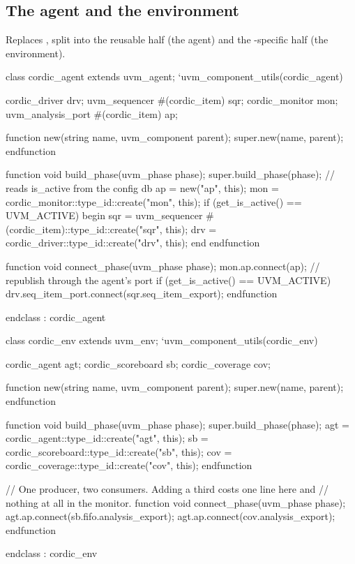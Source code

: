 \subsection{The agent and the environment}

Replaces , split into the reusable half (the agent) and the
\DUT{}-specific half (the environment).

\begin{uvmcode}[caption={\code{cordic\_agent} and \code{cordic\_env}},label={lst:uvm:env}]
  class cordic_agent extends uvm_agent;
    `uvm_component_utils(cordic_agent)

    cordic_driver                    drv;
    uvm_sequencer #(cordic_item)     sqr;
    cordic_monitor                   mon;
    uvm_analysis_port #(cordic_item) ap;

    function new(string name, uvm_component parent);
      super.new(name, parent);
    endfunction

    function void build_phase(uvm_phase phase);
      super.build_phase(phase);      // reads is_active from the config db
      ap  = new("ap", this);
      mon = cordic_monitor::type_id::create("mon", this);
      if (get_is_active() == UVM_ACTIVE) begin
        sqr = uvm_sequencer #(cordic_item)::type_id::create("sqr", this);
        drv = cordic_driver::type_id::create("drv", this);
      end
    endfunction

    function void connect_phase(uvm_phase phase);
      mon.ap.connect(ap);            // republish through the agent's port
      if (get_is_active() == UVM_ACTIVE)
        drv.seq_item_port.connect(sqr.seq_item_export);
    endfunction

  endclass : cordic_agent


  class cordic_env extends uvm_env;
    `uvm_component_utils(cordic_env)

    cordic_agent      agt;
    cordic_scoreboard sb;
    cordic_coverage   cov;

    function new(string name, uvm_component parent);
      super.new(name, parent);
    endfunction

    function void build_phase(uvm_phase phase);
      super.build_phase(phase);
      agt = cordic_agent::type_id::create("agt", this);
      sb  = cordic_scoreboard::type_id::create("sb",  this);
      cov = cordic_coverage::type_id::create("cov", this);
    endfunction

    // One producer, two consumers.  Adding a third costs one line here and
    // nothing at all in the monitor.
    function void connect_phase(uvm_phase phase);
      agt.ap.connect(sb.fifo.analysis_export);
      agt.ap.connect(cov.analysis_export);
    endfunction

  endclass : cordic_env
\end{uvmcode}

